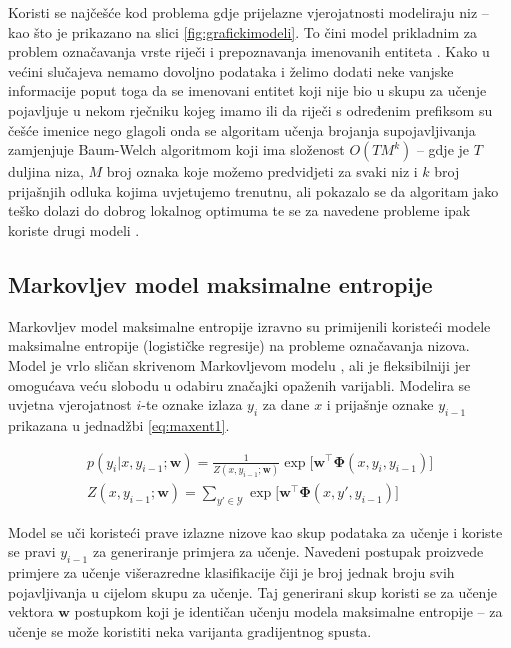 Koristi se najčešće kod problema gdje prijelazne vjerojatnosti modeliraju niz --
kao što je prikazano na slici \ref{fig:grafickimodeli}. To čini model prikladnim
za problem označavanja vrste riječi \citep{halacsy2007hunpos} i prepoznavanja
imenovanih entiteta \citep{zhou2002named}. Kako u većini slučajeva nemamo
dovoljno podataka i želimo dodati neke vanjske informacije poput toga da se
imenovani entitet koji nije bio u skupu za učenje pojavljuje u nekom rječniku
kojeg imamo ili da riječi s određenim prefiksom su češće imenice nego glagoli
onda se algoritam učenja brojanja supojavljivanja zamjenjuje Baum-Welch
algoritmom koji ima složenost $O(T M ^ k)$ -- gdje je $T$ duljina niza, $M$ broj
oznaka koje možemo predvidjeti za svaki niz i $k$ broj prijašnjih odluka kojima
uvjetujemo trenutnu, ali pokazalo se da algoritam jako teško dolazi do dobrog
lokalnog optimuma te se za navedene probleme ipak koriste drugi modeli
\citep{johnson2007doesn}.

\subsection{Markovljev model maksimalne entropije}

Markovljev model maksimalne entropije 
izravno su primijenili \citet*{mccallum2000maximum} koristeći modele maksimalne
entropije (logističke regresije) na probleme označavanja nizova. Model je vrlo
sličan skrivenom Markovljevom modelu , ali je
fleksibilniji jer omogućava veću slobodu u odabiru značajki opaženih varijabli.
Modelira se uvjetna vjerojatnost $i$-te oznake izlaza $y_i$ za dane $x$ i
prijašnje oznake $y_{i-1}$ prikazana u jednadžbi \ref{eq:maxent1}.

\begin{equation}\label{eq:maxent1}
\begin{aligned}
  p(y_i | x, y_{i-1}; \mathbf{w}) = \frac{1}{Z(x, y_{i-1}; \mathbf{w})} \exp \big[ \mathbf{w}^\top \mathbf{\Phi}(x, y_i, y_{i-1})\big] \\
  Z(x, y_{i-1}; \mathbf{w}) = \sum_{y' \in \mathcal{Y}} \exp \big[ \mathbf{w}^\top \mathbf{\Phi}(x, y', y_{i-1})\big]
\end{aligned}
\end{equation}

Model se uči koristeći prave izlazne nizove kao skup podataka za učenje i
koriste se pravi $y_{i-1}$ za generiranje primjera za učenje. Navedeni postupak
proizvede primjere za učenje višerazredne klasifikacije čiji je broj jednak
broju svih pojavljivanja u cijelom skupu za učenje. Taj generirani skup koristi
se za učenje vektora $\mathbf{w}$ postupkom koji je identičan učenju modela
maksimalne entropije -- za učenje se može koristiti neka varijanta gradijentnog
spusta.

